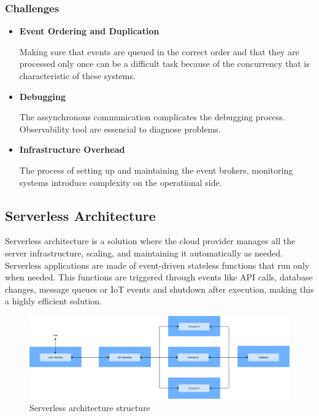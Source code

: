 \subsubsection{Challenges}
\begin{itemize}
	\item \textbf{Event Ordering and Duplication}

	      Making sure that events are queued in the correct order and that they are
	      processed only once can be a difficult task because of the concurrency
	      that is characteristic of these systems.

	\item \textbf{Debugging}

	      The assynchronous communication complicates the debugging process.
	      Observability tool are essencial to diagnose problems.

	\item \textbf{Infrastructure Overhead}

	      The process of setting up and maintaining the event brokers, monitoring
	      systems introduce complexity on the operational side.
\end{itemize}

\subsection{Serverless Architecture}
Serverless architecture is a solution where the cloud provider manages all the
server infrastructure, scaling, and maintaining it automatically as needed.
Serverless applications are made of event-driven stateless functions that run
only when needed\cite{marcelino2024goldfish}. This functions are triggered through events like API calls,
database changes, message queues or IoT events and shutdown after execution,
making this a highly efficient solution.

\begin{figure}[htbp]
	\centering
	\includegraphics[width=\textwidth, height=0.5\textheight, keepaspectratio]{Chapters/Figures/Architectures/Serverless.pdf}
	\caption{Serverless architecture structure}
	\label{fig:architectures:serverless}
\end{figure}

